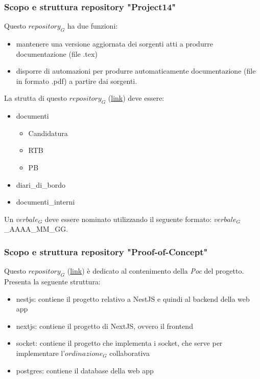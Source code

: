 \subsubsection{Scopo e struttura repository "Project14"}
Questo $\textit{repository}_G$ ha due funzioni:
\begin{itemize}
    \item mantenere una versione aggiornata dei sorgenti atti a produrre documentazione (file .tex)
    \item disporre di automazioni per produrre automaticamente documentazione (file in formato .pdf) a partire dai sorgenti.
\end{itemize}
La strutta di questo $\textit{repository}_G$ (\href{https://github.com/RAMtastic6/Project14}{link}) deve essere:
\begin{itemize}
    \item documenti
    \begin{itemize}
        \item Candidatura
        \item RTB
        \item PB
    \end{itemize}
    \item diari\_di\_bordo
    \item documenti\_interni
\end{itemize}
Un $\textit{verbale}_G$ deve essere nominato utilizzando il seguente formato: $\textit{verbale}_G$\_AAAA\_MM\_GG.

\subsubsection{Scopo e struttura repository "Proof-of-Concept"}
Questo $\textit{repository}_G$ (\href{https://github.com/RAMtastic6/Proof-of-Concept}{link}) è dedicato al contenimento della \textit{Poc} del progetto. \\
Presenta la seguente struttura:
\begin{itemize}
    \item nestjs: contiene il progetto relativo a NestJS e quindi al backend della web app
    \item nextjs: contiene il progetto di NextJS, ovvero il frontend
    \item socket: contiene il progetto che implementa i socket, che serve per implementare l'$\textit{ordinazione}_G$ collaborativa
    \item postgres: contiene il database della web app
\end{itemize}


